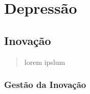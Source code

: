 \chapter{Depressão}\label{cap:depressao}


\section{Inovação}

\begin{quote}
lorem ipslum
\end{quote}

\subsection{Gestão da Inovação}




